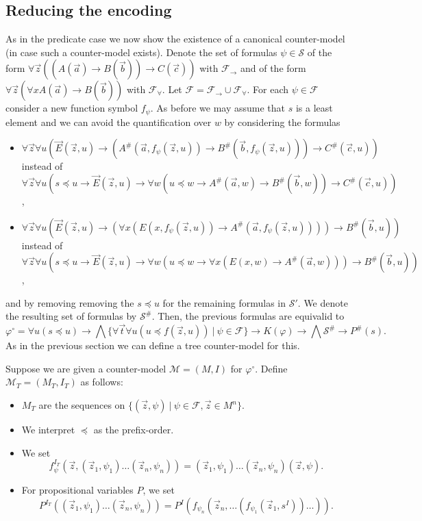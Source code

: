 \documentclass[a4paper,UKenglish,cleveref, autoref, thm-restate]{lipics-v2021}
\begin{document}
\subsection{Reducing the encoding}

As in the predicate case we now show the existence of a canonical counter-model (in case such a counter-model exists). Denote the set of formulas $\psi\in\mathcal S$ of the form $\forall\vec z((A(\vec a)\to B(\vec b))\to C(\vec c))$ with $\mathcal F_\to$ and of the form $\forall \vec z(\forall xA(\vec a)\to B(\vec b))$ with $\mathcal F_\forall$. Let $\mathcal F = \mathcal F_\to\cup\mathcal F_\forall$. For each  $\psi\in\mathcal F$ consider a new function symbol $f_\psi$. As before we may assume that $s$ is a least element and we can avoid the quantification over $w$ by considering the formulas
\begin{itemize}
	\item $\forall \vec z\forall u(\vec E(\vec z, u)\to (A^\#(\vec a, f_\psi(\vec z, u))\to B^\#(\vec b, f_\psi(\vec z, u)))\to C^\#(\vec c, u))$\\instead of $\forall \vec z\forall u(s\preceq u\to\vec E(\vec z, u)\to \forall w(u\preceq w\to A^\#(\vec a, w)\to B^\#(\vec b, w))\to C^\#(\vec c, u))$,
	\item $\forall \vec z\forall u(\vec E(\vec z, u)\to (\forall x(E(x, f_\psi(\vec z, u))\to A^\#(\vec a, f_\psi(\vec z, u))))\to B^\#(\vec b, u))$\\instead of $\forall \vec z\forall u(s\preceq u\to\vec E(\vec z, u)\to \forall w(u\preceq w\to \forall x(E(x, w)\to A^\#(\vec a, w)))\to B^\#(\vec b, u))$,
\end{itemize}
and by removing removing the $s\preceq u$ for the remaining formulas in $\mathcal S'$.
We denote the resulting set of formulas by $\mathcal S^\#$.
Then, the previous formulas are equivalid to
$$\varphi^\circ= \forall u(s\preceq u)\to \bigwedge\{\forall \vec t\forall u(u\preceq f(\vec z, u))\:|\:\psi\in\mathcal F\}\to K(\varphi)\to\bigwedge\mathcal S^\#\to P^\#(s).$$
As in the previous section we can define a tree counter-model for this.

\begin{definition}
	Suppose we are given a counter-model $\mathcal M = (M, I)$ for $\varphi^\circ$. Define $\mathcal M_T = (M_T, I_T)$ as follows:
	\begin{itemize}
		\item $M_T$ are the sequences on $\{(\vec z, \psi)\:|\:\psi\in \mathcal F, \vec z\in M^n\}$.
		\item We interpret $\preceq$ as the prefix-order.
		\item We set $$f_\psi^{I_T}(\vec z, (\vec z_1, \psi_1)\dots (\vec z_n, \psi_n)) = (\vec z_1, \psi_1)\dots (\vec z_n, \psi_n)(\vec z, \psi).$$
		\item For propositional variables $P$, we set $$P^{I_T}((\vec z_1, \psi_1)\dots (\vec z_n, \psi_n)) = P^I(f_{\psi_n}(\vec z_n, \dots(f_{\psi_1}(\vec z_1, s^I))\dots)).$$
	\end{itemize}
\end{definition}
\end{document}
